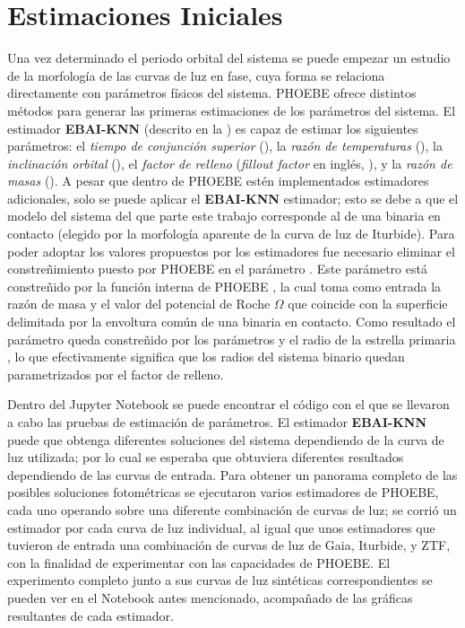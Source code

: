 \section{Estimaciones Iniciales}

Una vez determinado el periodo orbital del sistema se puede empezar un estudio
de la morfología de las curvas de luz en fase, cuya forma se relaciona
directamente con parámetros físicos del sistema. PHOEBE ofrece distintos métodos
para generar las primeras estimaciones de los parámetros del sistema. El
estimador \textbf{EBAI-KNN} (descrito en la
) es capaz de estimar
los siguientes parámetros: el \textit{tiempo de conjunción superior}
(), la \textit{razón de temperaturas} (), la
\textit{inclinación orbital} (), el \textit{factor de relleno}
(\textit{fillout factor} en inglés, ), y la \textit{razón
de masas} (). A pesar que dentro de PHOEBE estén implementados
estimadores adicionales, solo se puede aplicar el \textbf{EBAI-KNN} estimador;
esto se debe a que el modelo del sistema del que parte este trabajo corresponde
al de una binaria en contacto (elegido por la morfología aparente de la curva de
luz de Iturbide). Para poder adoptar los valores propuestos por los estimadores
fue necesario eliminar el constreñimiento puesto por PHOEBE en el parámetro
. Este parámetro está constreñido por la función interna
de PHOEBE , la cual toma como entrada la razón de
masa  y el valor del potencial de Roche $\Omega$ que coincide con la
superficie delimitada por la envoltura común de una binaria en contacto. Como
resultado el parámetro  queda constreñido por los
parámetros  y el radio de la estrella primaria
, lo que efectivamente significa que los radios del sistema binario
quedan parametrizados por el factor de relleno. 

Dentro del Jupyter Notebook
\href{https://github.com/KnightIV/UANL_MAPTA_PlanObservaciones/blob/main/analisis/phoebe_model/estimations/ebai-default.ipynb}{}
se puede encontrar el código con el que se llevaron a cabo las pruebas de
estimación de parámetros. El estimador \textbf{EBAI-KNN} puede que obtenga
diferentes soluciones del sistema dependiendo de la curva de luz utilizada; por
lo cual se esperaba que obtuviera diferentes resultados dependiendo de las curvas
de entrada. Para obtener un panorama completo de las posibles soluciones
fotométricas se ejecutaron varios estimadores de PHOEBE, cada uno operando sobre
una diferente combinación de curvas de luz; se corrió un estimador por cada
curva de luz individual, al igual que unos estimadores que tuvieron de entrada
una combinación de curvas de luz de Gaia, Iturbide, y ZTF, con la finalidad de
experimentar con las capacidades de PHOEBE. El experimento completo junto a sus
curvas de luz sintéticas correspondientes se pueden ver en el Notebook
antes mencionado, acompañado de las gráficas resultantes de cada estimador.


